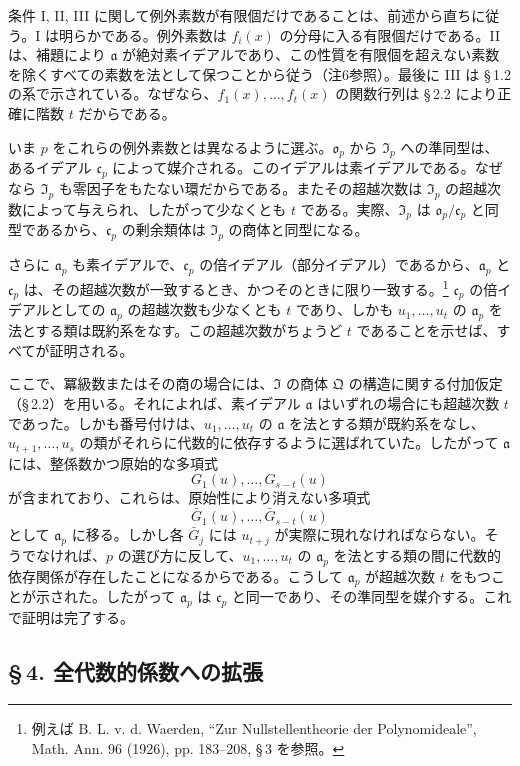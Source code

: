 条件 I, II, III に関して例外素数が有限個だけであることは、前述から直ちに従う。I は明らかである。例外素数は $f_i(x)$ の分母に入る有限個だけである。II は、補題により $\mathfrak{a}$ が絶対素イデアルであり、この性質を有限個を超えない素数を除くすべての素数を法として保つことから従う（注6参照）。最後に III は \S\,1.2 の系で示されている。なぜなら、$f_1(x),\ldots,f_t(x)$ の関数行列は \S\,2.2 により正確に階数 $t$ だからである。

いま $p$ をこれらの例外素数とは異なるように選ぶ。$\mathfrak{o}_p$ から $\mathfrak{I}_p$ への準同型は、あるイデアル $\mathfrak{c}_p$ によって媒介される。このイデアルは素イデアルである。なぜなら $\mathfrak{I}_p$ も零因子をもたない環だからである。またその超越次数は $\mathfrak{I}_p$ の超越次数によって与えられ、したがって少なくとも $t$ である。実際、$\mathfrak{I}_p$ は $\mathfrak{o}_p/\mathfrak{c}_p$ と同型であるから、$\mathfrak{c}_p$ の剰余類体は $\mathfrak{I}_p$ の商体と同型になる。

さらに $\mathfrak{a}_p$ も素イデアルで、$\mathfrak{c}_p$ の倍イデアル（部分イデアル）であるから、$\mathfrak{a}_p$ と $\mathfrak{c}_p$ は、その超越次数が一致するとき、かつそのときに限り一致する。\footnote{例えば B. L. v. d. Waerden, ``Zur Nullstellentheorie der Polynomideale'', Math. Ann. 96 (1926), pp. 183--208, \S\,3 を参照。} $\mathfrak{c}_p$ の倍イデアルとしての $\mathfrak{a}_p$ の超越次数も少なくとも $t$ であり、しかも $u_1,\ldots,u_t$ の $\mathfrak{a}_p$ を法とする類は既約系をなす。この超越次数がちょうど $t$ であることを示せば、すべてが証明される。

ここで、冪級数またはその商の場合には、$\mathfrak{I}$ の商体 $\mathfrak{Q}$ の構造に関する付加仮定（\S\,2.2）を用いる。それによれば、素イデアル $\mathfrak{a}$ はいずれの場合にも超越次数 $t$ であった。しかも番号付けは、$u_1,\ldots,u_t$ の $\mathfrak{a}$ を法とする類が既約系をなし、$u_{t+1},\ldots,u_s$ の類がそれらに代数的に依存するように選ばれていた。したがって $\mathfrak{a}$ には、整係数かつ原始的な多項式
\[
G_1(u),\ldots,G_{s-t}(u)\tag{1}
\]
が含まれており、これらは、原始性により消えない多項式
\[
\bar G_1(u),\ldots,\bar G_{s-t}(u)\tag{2}
\]
として $\mathfrak{a}_p$ に移る。しかし各 $\bar G_j$ には $u_{t+j}$ が実際に現れなければならない。そうでなければ、$p$ の選び方に反して、$u_1,\ldots,u_t$ の $\mathfrak{a}_p$ を法とする類の間に代数的依存関係が存在したことになるからである。こうして $\mathfrak{a}_p$ が超越次数 $t$ をもつことが示された。したがって $\mathfrak{a}_p$ は $\mathfrak{c}_p$ と同一であり、その準同型を媒介する。これで証明は完了する。

\subsection*{\S\,4. 全代数的係数への拡張}

